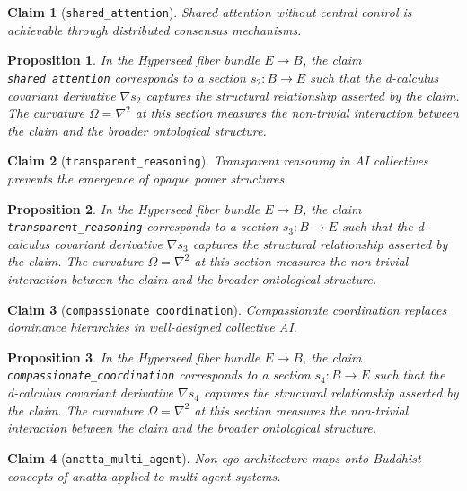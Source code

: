 \documentclass{article}
\newtheorem{claim}{Claim}
\newtheorem{proposition}{Proposition}
\begin{document}
\begin{claim}[\texttt{shared_attention}]
Shared attention without central control is achievable through distributed consensus mechanisms.
\end{claim}

\begin{proposition}
In the Hyperseed fiber bundle $E \to B$, the claim \texttt{shared_attention} corresponds to a section $s_2: B \to E$ such that the d-calculus covariant derivative $\nabla s_2$ captures the structural relationship asserted by the claim. The curvature $\Omega = \nabla^2$ at this section measures the non-trivial interaction between the claim and the broader ontological structure.
\end{proposition}

\begin{claim}[\texttt{transparent_reasoning}]
Transparent reasoning in AI collectives prevents the emergence of opaque power structures.
\end{claim}

\begin{proposition}
In the Hyperseed fiber bundle $E \to B$, the claim \texttt{transparent_reasoning} corresponds to a section $s_3: B \to E$ such that the d-calculus covariant derivative $\nabla s_3$ captures the structural relationship asserted by the claim. The curvature $\Omega = \nabla^2$ at this section measures the non-trivial interaction between the claim and the broader ontological structure.
\end{proposition}

\begin{claim}[\texttt{compassionate_coordination}]
Compassionate coordination replaces dominance hierarchies in well-designed collective AI.
\end{claim}

\begin{proposition}
In the Hyperseed fiber bundle $E \to B$, the claim \texttt{compassionate_coordination} corresponds to a section $s_4: B \to E$ such that the d-calculus covariant derivative $\nabla s_4$ captures the structural relationship asserted by the claim. The curvature $\Omega = \nabla^2$ at this section measures the non-trivial interaction between the claim and the broader ontological structure.
\end{proposition}

\begin{claim}[\texttt{anatta_multi_agent}]
Non-ego architecture maps onto Buddhist concepts of anatta applied to multi-agent systems.
\end{claim}
\end{document}
